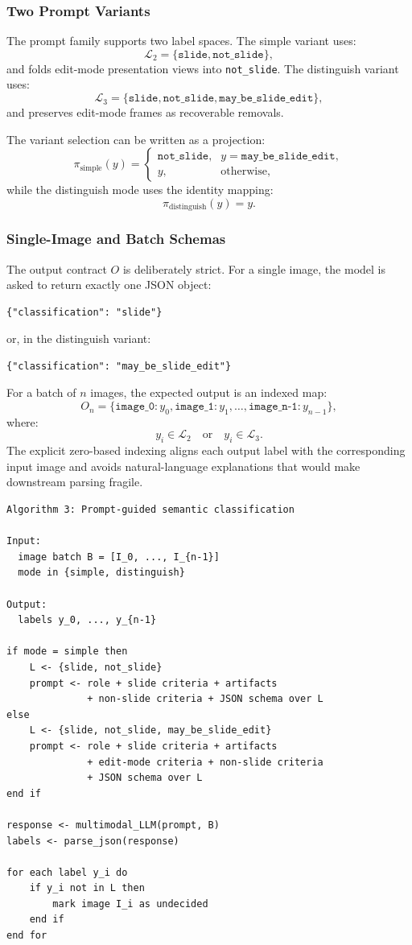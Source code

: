 \documentclass[11pt]{article}
\begin{document}
\subsubsection*{Two Prompt Variants}

The prompt family supports two label spaces. The simple variant uses:
\[
\mathcal{L}_2=\{\texttt{slide},\texttt{not\_slide}\},
\]
and folds edit-mode presentation views into \texttt{not\_slide}. The distinguish variant uses:
\[
\mathcal{L}_3=\{\texttt{slide},\texttt{not\_slide},\texttt{may\_be\_slide\_edit}\},
\]
and preserves edit-mode frames as recoverable removals.

The variant selection can be written as a projection:
\[
\pi_{\text{simple}}(y)=
\begin{cases}
\texttt{not\_slide}, & y=\texttt{may\_be\_slide\_edit},\\
y, & \text{otherwise},
\end{cases}
\]
while the distinguish mode uses the identity mapping:
\[
\pi_{\text{distinguish}}(y)=y.
\]

\subsubsection*{Single-Image and Batch Schemas}

The output contract $O$ is deliberately strict. For a single image, the model is asked to return exactly one JSON object:
\begin{verbatim}
{"classification": "slide"}
\end{verbatim}
or, in the distinguish variant:
\begin{verbatim}
{"classification": "may_be_slide_edit"}
\end{verbatim}

For a batch of $n$ images, the expected output is an indexed map:
\[
O_n = \{\texttt{image\_0}:y_0,\texttt{image\_1}:y_1,\ldots,
\texttt{image\_{n-1}}:y_{n-1}\},
\]
where:
\[
y_i \in \mathcal{L}_2
\quad \text{or} \quad
y_i \in \mathcal{L}_3.
\]
The explicit zero-based indexing aligns each output label with the corresponding input image and avoids natural-language explanations that would make downstream parsing fragile.

\begin{verbatim}
Algorithm 3: Prompt-guided semantic classification

Input:
  image batch B = [I_0, ..., I_{n-1}]
  mode in {simple, distinguish}

Output:
  labels y_0, ..., y_{n-1}

if mode = simple then
    L <- {slide, not_slide}
    prompt <- role + slide criteria + artifacts
              + non-slide criteria + JSON schema over L
else
    L <- {slide, not_slide, may_be_slide_edit}
    prompt <- role + slide criteria + artifacts
              + edit-mode criteria + non-slide criteria
              + JSON schema over L
end if

response <- multimodal_LLM(prompt, B)
labels <- parse_json(response)

for each label y_i do
    if y_i not in L then
        mark image I_i as undecided
    end if
end for
\end{verbatim}
\end{document}
